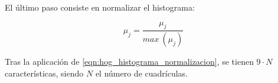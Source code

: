 El último paso consiste en normalizar el histograma:

\begin{equation}
	\label{eqn:hog_histograma_normalizacion}
	\mu_{j} = \dfrac{\mu_{j}}{max\:(\mu_{j})}
\end{equation}

Tras la aplicación de \ref{eqn:hog_histograma_normalizacion}, se tienen $ 9\cdot N$ características, siendo $ N $ el número de cuadrículas.

